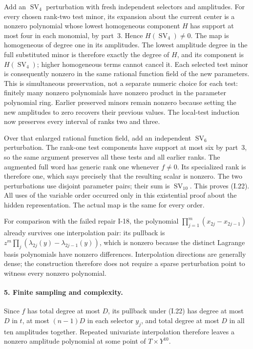 Add an $\operatorname{SV}_4$ perturbation with fresh independent
selectors and amplitudes.  For every chosen rank-two test minor,
its expansion about the current center is a nonzero polynomial
whose lowest homogeneous component $H$ has support at most four
in each monomial, by part~3.  Hence $H(\operatorname{SV}_4)\ne0$.
The map is homogeneous of degree one in its amplitudes.  The
lowest amplitude degree in the full substituted minor is
therefore exactly the degree of $H$, and its component is
$H(\operatorname{SV}_4)$; higher homogeneous terms cannot cancel
it.  Each selected test minor is consequently nonzero in the
same rational function field of the new parameters.  This is
simultaneous preservation, not a separate numeric choice for
each test: finitely many nonzero polynomials have nonzero product
in the parameter polynomial ring.  Earlier preserved minors
remain nonzero because setting the new amplitudes to zero
recovers their previous values.  The local-test induction now
preserves every interval of ranks two and three.

Over that enlarged rational function field, add an independent
$\operatorname{SV}_6$ perturbation.  The rank-one test components
have support at most six by part~3, so the same argument preserves
all these tests and all earlier ranks.  The augmented full word
has generic rank one whenever $f\ne0$.  Its specialized rank is
therefore one, which says precisely that the resulting scalar is
nonzero.  The two perturbations use disjoint parameter pairs;
their sum is $\operatorname{SV}_{10}$.  This proves (I.22).
All uses of the variable order occurred only in this existential
proof about the hidden representation.  The actual map is the
same for every order.

For comparison with the failed repair I-18, the polynomial
$\prod_{j=1}^m(x_{2j}-x_{2j-1})$ already survives one interpolation
pair: its pullback is
$z^m\prod_j(\lambda_{2j}(y)-\lambda_{2j-1}(y))$, which is nonzero
because the distinct Lagrange basis polynomials have nonzero
differences.  Interpolation directions are generally dense;
the construction therefore does not require a sparse perturbation
point to witness every nonzero polynomial.

\paragraph{5. Finite sampling and complexity.}
Since $f$ has total degree at most $D$, its pullback under (I.22)
has degree at most $D$ in $t$, at most $(n-1)D$ in each selector
$y_j$, and total degree at most $D$ in all ten amplitudes together.
Repeated univariate interpolation therefore leaves a nonzero
amplitude polynomial at some point of $T\times Y^{10}$.

